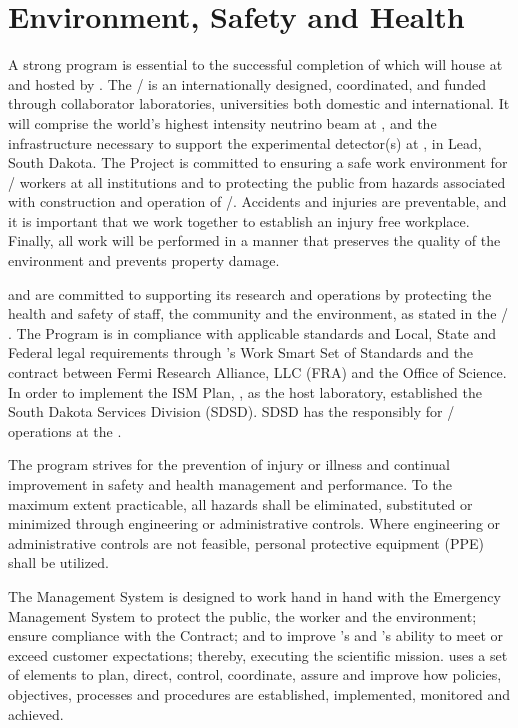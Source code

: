 \chapter{Environment, Safety and Health}
\label{vl:tc-ESH}


A strong  program is essential to the successful completion
of  which will house  at \surf and hosted by
\fnal.  The / is an internationally designed,
coordinated, and funded through collaborator laboratories,
universities both domestic and international.  It will comprise the
world's highest intensity neutrino beam at \fnal, and the
infrastructure necessary to support the experimental detector(s) at
\surf, in Lead, South Dakota.  The Project is committed to ensuring a
safe work environment for / workers at all
institutions and to protecting the public from hazards associated with
construction and operation of /.  Accidents and
injuries are preventable, and it is important that we work together to
establish an injury free workplace.  Finally, all work will be
performed in a manner that preserves the quality of the environment
and prevents property damage.

\fnal and  are committed to supporting its research and
operations by protecting the health and safety of staff, the community
and the environment, as stated in the /
. The  Program
is in compliance with applicable standards and Local, State and
Federal legal requirements through \fnal's Work Smart Set of Standards
and the contract between Fermi Research Alliance, LLC (FRA) and the
 Office of Science.  In order to implement the
ISM Plan, \fnal, as the host laboratory, established the South Dakota
Services Division (SDSD).  SDSD has the responsibly for
/ operations at the \surf.

The program strives for the prevention of injury or illness and
continual improvement in safety and health management and performance.
To the maximum extent practicable, all hazards shall be eliminated,
substituted or minimized through engineering or administrative
controls.  Where engineering or administrative controls are not
feasible, personal protective equipment (PPE) shall be utilized.

The  Management System is
designed to work hand in hand with the Emergency Management System to
protect the public, the worker and the environment; ensure compliance
with the Contract; and to improve \fnal's and 's ability to
meet or exceed customer expectations; thereby, executing the
scientific mission.  \fnal uses a set of elements to plan, direct,
control, coordinate, assure and improve how  policies, objectives,
processes and procedures are established, implemented, monitored and
achieved.

